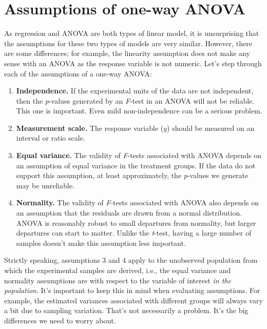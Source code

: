 \documentclass[
]{book}
\begin{document}
\hypertarget{assumptions-of-one-way-anova}{%
\section{Assumptions of one-way ANOVA}\label{assumptions-of-one-way-anova}}

As regression and ANOVA are both types of linear model, it is unsurprising that the assumptions for these two types of models are very similar. However, there are some differences; for example, the linearity assumption does not make any sense with an ANOVA as the response variable is not numeric. Let's step through each of the assumptions of a one-way ANOVA:

\begin{enumerate}
\def\labelenumi{\arabic{enumi}.}
\item
  \textbf{Independence.} If the experimental units of the data are not independent, then the \emph{p}-values generated by an \emph{F}-test in an ANOVA will not be reliable. This one is important. Even mild non-independence can be a serious problem.
\item
  \textbf{Measurement scale.} The response variable (\(y\)) should be measured on an interval or ratio scale.
\item
  \textbf{Equal variance.} The validity of \emph{F}-tests associated with ANOVA depends on an assumption of equal variance in the treatment groups. If the data do not support this assumption, at least approximately, the \emph{p}-values we generate may be unreliable.
\item
  \textbf{Normality.} The validity of \emph{F}-tests associated with ANOVA also depends on an assumption that the residuals are drawn from a normal distribution. ANOVA is reasonably robust to small departures from normality, but larger departures can start to matter. Unlike the \emph{t}-test, having a large number of samples doesn't make this assumption less important.
\end{enumerate}

Strictly speaking, assumptions 3 and 4 apply to the unobserved population from which the experimental samples are derived, i.e., the equal variance and normality assumptions are with respect to the variable of interest \emph{in the population}. It's important to keep this in mind when evaluating assumptions. For example, the estimated variances associated with different groups will always vary a bit due to sampling variation. That's not necessarily a problem. It's the big differences we need to worry about.
\end{document}
